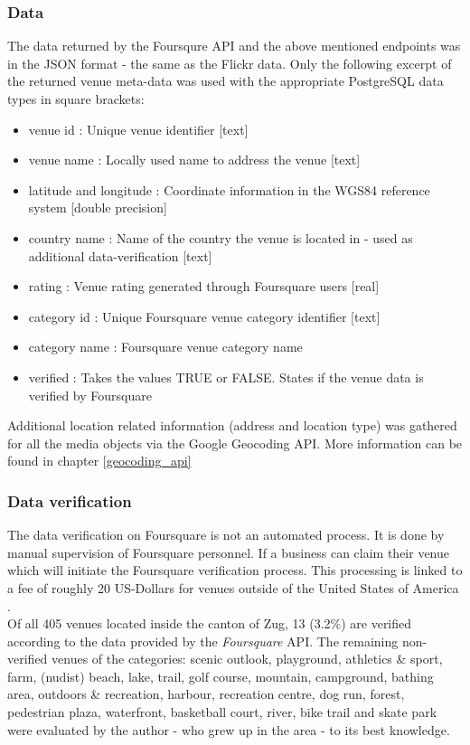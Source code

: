 \subsubsection{Data} \label{fq_data}
The data returned by the Foursqure API and the above mentioned endpoints was in the JSON format - the same as the Flickr data.
Only the following excerpt of the returned venue meta-data was used with the appropriate PostgreSQL data types in square brackets: \\
\begin{itemize}
    \item venue id : Unique venue identifier [text]
    \item venue name : Locally used name to address the venue [text]
    \item latitude and longitude : Coordinate information in the WGS84 reference system [double precision]
    \item country name : Name of the country the venue is located in - used as additional data-verification [text]
    \item rating : Venue rating generated through Foursquare users [real]
    \item category id : Unique Foursquare venue category identifier [text]
    \item category name : Foursquare venue category name
    \item verified : Takes the values TRUE or FALSE. States if the venue data is verified by Foursquare
\end{itemize}

Additional location related information (address and location type) was gathered for all the media objects via the Google Geocoding API. More information can be found in chapter \ref{geocoding_api}

\subsubsection{Data verification} \label{foursquare_data_verification}
The data verification on Foursquare is not an automated process. It is done by manual supervision of Foursquare personnel. If a business can claim their venue which will initiate the Foursquare verification process. This processing is linked to a fee of roughly 20 US-Dollars for venues outside of the United States of America \parencite{Foursquare2019}. \\
Of all 405 venues located inside the canton of Zug, 13 (3.2\%) are verified according to the data provided by the \textit{Foursquare} API. The remaining non-verified venues of the categories: scenic outlook, playground, athletics \& sport, farm, (nudist) beach, lake, trail, golf course, mountain, campground, bathing area, outdoors \& recreation, harbour, recreation centre, dog run, forest, pedestrian plaza, waterfront, basketball court, river, bike trail and skate park were evaluated by the author - who grew up in the area - to its best knowledge.

